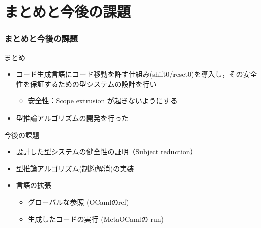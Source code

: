 \section{まとめと今後の課題}

\begin{frame}
  \frametitle{まとめと今後の課題}
  まとめ
  \begin{itemize}
  \item コード生成言語にコード移動を許す仕組み(shift0/reset0)を導入し，その安全性を保証するための型システムの設計を行い
    \begin{itemize}
    \item 安全性：Scope extrusion が起きないようにする
    \end{itemize}
  \item 型推論アルゴリズムの開発を行った
  \end{itemize}

  \vspace{\baselineskip}

  今後の課題
  \begin{itemize}
  \item 設計した型システムの健全性の証明（Subject reduction）
  \item 型推論アルゴリズム(制約解消)の実装
  \item 言語の拡張
    \begin{itemize}
    \item グローバルな参照 (OCamlのref)
    \item 生成したコードの実行 (MetaOCamlの run)
    \end{itemize}
  \end{itemize}
\end{frame}

